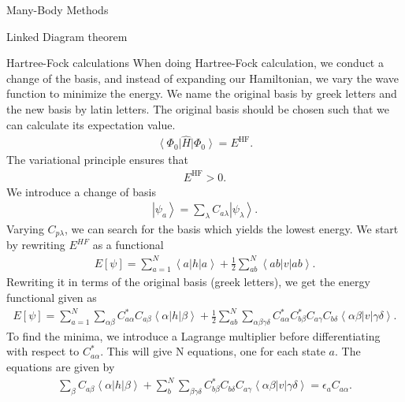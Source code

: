 \documentclass[twoside,english]{uiofysmaster}
\begin{document}
\begin{chapter}{Many-Body Methods}
\begin{section}{Linked Diagram theorem}
	\end{section}

	\begin{section}{Hartree-Fock calculations}
 		When doing Hartree-Fock calculation, we conduct a
                change of the basis, and instead of expanding our
                Hamiltonian, we vary the wave function to minimize the
                energy. We name the original basis by greek letters
                and the new basis by latin letters. The original basis
                should be chosen such that we can calculate its
                expectation value.
 		\begin{align}
 			\left< \Phi_0 \right| \hat H \left| \Phi_0 \right> = E^{\text{HF}}.
 		\end{align}
 		The variational principle ensures that 
 		\begin{align}
 			E^{\text{HF}} > 0 .
 		\end{align}
 		We introduce a change of basis
 		\begin{align}
 			\left| \psi_a \right> = \sum_{\lambda} C_{a\lambda} \left| \psi_{\lambda} \right>.
 		\end{align}
 		Varying $C_{p\lambda}$, we can search for the basis which yields the lowest energy. We start by rewriting $E^{HF}$ as a functional
 		\begin{align}
 			E\left[ \psi \right] = \sum_{a=1}^N \left< a \right| h \left| a \right> + \frac{1}{2} \sum_{ab}^N \left< ab \right| v \left| ab \right>.
  		\end{align}
  		Rewriting it in terms of the original basis (greek letters), we get the energy functional given as
  		\begin{align}
  			E\left[ \psi \right] = \sum_{a=1}^N \sum_{\alpha \beta} C_{a \alpha}^* C_{a \beta} \left< \alpha \right| h \left| \beta \right> + \frac{1}{2} \sum_{ab}^N \sum_{\alpha \beta \gamma \delta} C_{a \alpha}^* C_{b \beta}^* C_{a \gamma} C_{b \delta} \left< \alpha \beta \right| v \left| \gamma \delta \right>.
  		\end{align}
  		To find the minima, we introduce a Lagrange multiplier before differentiating with respect to $C_{a  \alpha}^*$. This will give N equations, one for each state $a$. The equations are given by
  		\begin{align}
  			\sum_{\beta} C_{a \beta} \left< \alpha \right| h \left| \beta \right> + \sum_b^N \sum_{\beta \gamma \delta} C_{b \beta}^* C_{b \delta} C_{a \gamma} \left< \alpha \beta \right| v \left| \gamma \delta \right> = \epsilon_a C_{a \alpha}.

\end{align}
\end{section}
\end{chapter}
\end{document}
